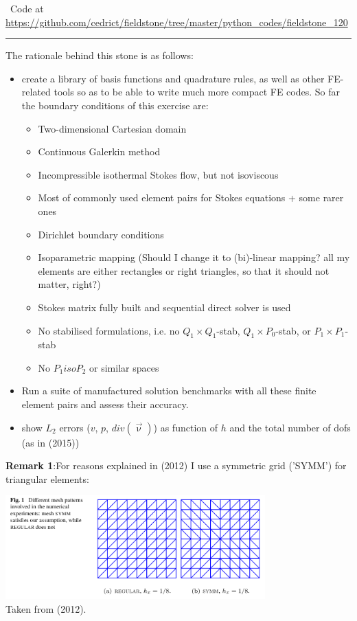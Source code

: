 %

\begin{center}
\inpython~Code at \url{https://github.com/cedrict/fieldstone/tree/master/python_codes/fieldstone_120}
\end{center}

\par\noindent\rule{\textwidth}{0.4pt}


The rationale behind this stone is as follows:
\begin{itemize}
\item create a library of basis functions and quadrature rules, as well as 
other FE-related tools so as to be able to write much more compact FE codes. 
So far the boundary conditions of this exercise are:
\begin{itemize}
\item Two-dimensional Cartesian domain
\item Continuous Galerkin method
\item Incompressible isothermal Stokes flow, but not isoviscous
\item Most of commonly used element pairs for Stokes equations + some rarer ones 
\item Dirichlet boundary conditions 
\item Isoparametric mapping (Should I change it to (bi)-linear mapping? all my elements are either 
rectangles or right triangles, so that it should not matter, right?)
\item Stokes matrix fully built and sequential direct solver is used
\item No stabilised formulations, i.e. no $Q_1\times Q_1$-stab, $Q_1\times P_0$-stab, or 
      $P_1\times P_1$-stab
\item No $P_1isoP_2$ or similar spaces
\end{itemize}
\item Run a suite of manufactured solution benchmarks with all 
these finite element pairs and assess their accuracy.
\item show $L_2$ errors ($v$, $p$, $div(\vec\upnu)$) as function of $h$ and the total number of dofs (as in \textcite{cakp15} (2015))
\end{itemize}


{\bf Remark 1}:For reasons explained in \textcite{bocg12} (2012) I use 
a symmetric grid ('SYMM') for triangular elements:
\begin{center} 
\includegraphics[width=10cm]{python_codes/fieldstone_120/images/bocg12}\\
{\captionfont Taken from \textcite{bocg12} (2012).}
\end{center} 


